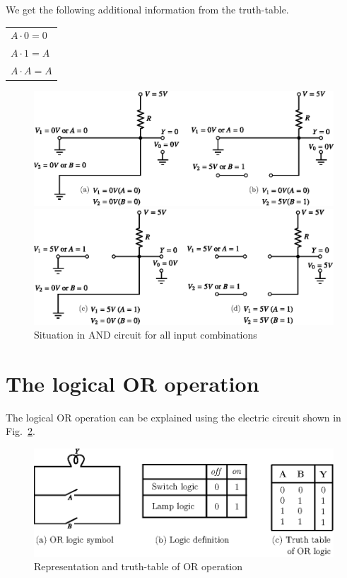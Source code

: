 We get the following additional information from the truth-table.
\begin{center}
\tabcolsep=8pt
\renewcommand{\arraystretch}{1.2}
\begin{tabular}{|l|}
\hline
$A\cdot 0=0$\\
$A\cdot 1=A$\\
$A\cdot A=A$\\
\hline
\end{tabular}
\end{center}
\begin{figure}[H]
\centering
\includegraphics{chap6/fig81_6.7ab.eps}

\bigskip

\includegraphics{chap6/fig81_6.7cd.eps}
\caption{Situation in AND circuit for all input combinations}\label{fig6.7}
\end{figure}

\section{The logical OR operation}\label{sec6.17}

The logical OR operation can be explained using the electric circuit shown in Fig.~\ref{fig6.8}.
\begin{figure}[H]
\centering
\includegraphics{chap6/fig82_6.8.eps}
\caption{Representation and truth-table of OR operation}\label{fig6.8}
\end{figure}

